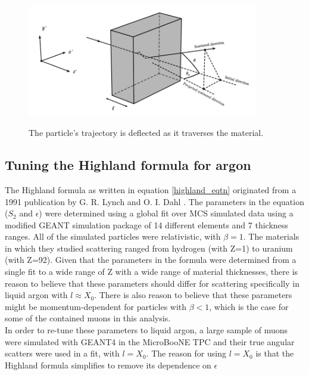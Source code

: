 \documentclass[a4paper,11pt]{article}
\begin{document}
\begin{figure}[ht!]
\centering
	\includegraphics[width=0.9\textwidth]{Figures/static_figs/mcs_nocap.png} \\
\caption{The particle's trajectory is deflected as it traverses the material.}\label{mcs_nocap_fig}
\end{figure}












\subsection{Tuning the Highland formula for argon}\label{highland_tuning_section}

The Highland formula as written in equation \ref{highland_eqtn} originated from a 1991 publication by G. R. Lynch and O. I. Dahl \cite{highland-lynch-dahl}. The parameters in the equation ($S_2$ and $\epsilon$) were determined using a global fit over MCS simulated data using a modified GEANT simulation package of 14 different elements and 7 thickness ranges. All of the simulated particles were relativistic, with $\beta=1$. The materials in which they studied scattering ranged from hydrogen (with Z=1) to uranium (with Z=92). Given that the parameters in the formula were determined from a single fit to a wide range of Z with a wide range of material thicknesses, there is reason to believe that these parameters should differ for scattering specifically in liquid argon with $l \approx X_0$. There is also reason to believe that these parameters might be momentum-dependent for particles with $\beta < 1$, which is the case for some of the contained muons in this analysis.\\

In order to re-tune these parameters to liquid argon, a large sample of muons were simulated with GEANT4 \cite{GEANT4_citation} in the MicroBooNE TPC and their true angular scatters were used in a fit, with $l = X_0$. The reason for using $l = X_0$ is that the Highland formula simplifies to remove its dependence on $\epsilon$
\end{document}
